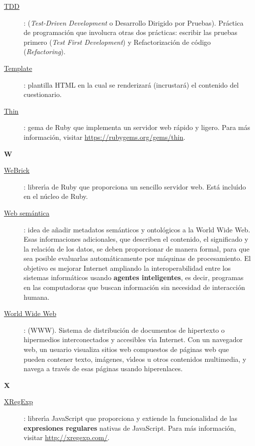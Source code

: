 \begin{description}
  \item[\underline{TDD}\label{apend1:tdd}]: (\textit{Test-Driven Development} o Desarrollo Dirigido por Pruebas). Pr\'actica de programaci\'on que involucra otras dos pr\'acticas: escribir las 
  pruebas primero (\textit{Test First Development}) y Refactorizaci\'on de c\'odigo (\textit{Refactoring}).
  \bigskip

  \item[\underline{Template}\label{apend1:template}]: plantilla HTML en la cual se renderizar\'a (incrustar\'a) el contenido del cuestionario.
  \bigskip

  \item[\underline{Thin}\label{apend1:thin}]: gema de Ruby que implementa un servidor web r\'apido y ligero. Para m\'as informaci\'on, visitar {\small \url{https://rubygems.org/gems/thin}}.
  \bigskip
\end{description}

\bigskip
{\bfseries {\Huge W}}\label{Apendice1:W}
\bigskip
\bigskip

\begin{description}
  \item[\underline{WeBrick}\label{apend1:webrick}]: librer\'{\i}a de Ruby que proporciona un sencillo servidor web. Est\'a inclu\'{\i}do en el n\'ucleo de Ruby. 
  \bigskip

  \item[\underline{Web sem\'antica}\label{apend1:web}]: idea de a\~{n}adir metadatos sem\'anticos y ontol\'ogicos a la World Wide Web. Esas informaciones adicionales, que describen el contenido, 
  el significado y la relaci\'on de los datos, se deben proporcionar de manera formal, para que sea posible evaluarlas autom\'aticamente por m\'aquinas de procesamiento. El objetivo es mejorar 
  Internet ampliando la interoperabilidad entre los sistemas inform\'aticos usando {\bfseries agentes inteligentes}, es decir, programas en las computadoras que buscan informaci\'on sin necesidad de 
  interacci\'on humana.
  \bigskip

  \item[\underline{World Wide Web}\label{apend1:www}]: (WWW). Sistema de distribuci\'on de documentos de hipertexto o hipermedios interconectados y accesibles v\'{\i}a Internet. Con un navegador 
  web, un usuario visualiza sitios web compuestos de p\'aginas web que pueden contener texto, im\'agenes, v\'{\i}deos u otros contenidos multimedia, y navega a trav\'es de esas p\'aginas usando 
hiperenlaces.
  \bigskip
\end{description}

\bigskip
{\bfseries {\Huge X}}\label{Apendice1:X}
\bigskip
\bigskip

\begin{description}
  \item[\underline{XRegExp}\label{apend1:xregexp}]: librer\'{\i}a JavaScript que proporciona y extiende la funcionalidad de las {\bfseries expresiones regulares} nativas de JavaScript. Para m\'as 
  informaci\'on, visitar {\small \url{http://xregexp.com/}}.
  \bigskip
\end{description}